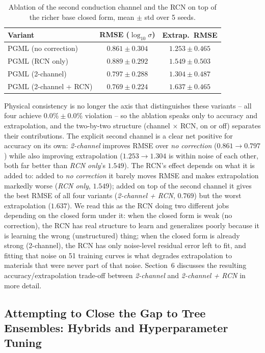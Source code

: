 \documentclass[11pt]{article}
\begin{document}
\begin{table}[h]
\centering
\caption{Ablation of the second conduction channel and the RCN on top of the richer base closed form, mean $\pm$ std over 5 seeds.}
\label{tab:ablation}
\begin{tabular}{lcc}
\toprule
Variant & RMSE ($\log_{10}\sigma$) & Extrap.\ RMSE \\
\midrule
PGML (no correction)     & $0.861 \pm 0.304$ & $\mathbf{1.253 \pm 0.465}$ \\
PGML (RCN only)          & $0.889 \pm 0.292$ & $1.549 \pm 0.503$ \\
PGML (2-channel)         & $0.797 \pm 0.288$ & $1.304 \pm 0.487$ \\
PGML (2-channel + RCN)   & $\mathbf{0.769 \pm 0.224}$ & $1.637 \pm 0.465$ \\
\bottomrule
\end{tabular}
\end{table}

Physical consistency is no longer the axis that distinguishes these variants -- all four achieve $0.0\% \pm 0.0\%$ violation -- so the ablation speaks only to accuracy and extrapolation, and the two-by-two structure (channel $\times$ RCN, on or off) separates their contributions. The explicit second channel is a clear net positive for accuracy on its own: \emph{2-channel} improves RMSE over \emph{no correction} ($0.861 \to 0.797$) while also improving extrapolation ($1.253 \to 1.304$ is within noise of each other, both far better than \emph{RCN only}'s $1.549$). The RCN's effect depends on what it is added to: added to \emph{no correction} it barely moves RMSE and makes extrapolation markedly worse (\emph{RCN only}, $1.549$); added on top of the second channel it gives the best RMSE of all four variants (\emph{2-channel + RCN}, $0.769$) but the worst extrapolation ($1.637$). We read this as the RCN doing two different jobs depending on the closed form under it: when the closed form is weak (no correction), the RCN has real structure to learn and generalizes poorly because it is learning the wrong (unstructured) thing; when the closed form is already strong (2-channel), the RCN has only noise-level residual error left to fit, and fitting that noise on 51 training curves is what degrades extrapolation to materials that were never part of that noise. Section~6 discusses the resulting accuracy/extrapolation trade-off between \emph{2-channel} and \emph{2-channel + RCN} in more detail.

\subsection{Attempting to Close the Gap to Tree Ensembles: Hybrids and Hyperparameter Tuning}
\end{document}
